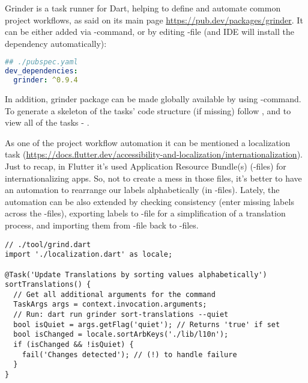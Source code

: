 Grinder is a task runner for Dart, helping to define and automate common project workflows, as said on its main page
\href{https://pub.dev/packages/grinder}{https://pub.dev/packages/grinder}.  It can be either added via -command, or by editing -file  (and IDE will install the dependency automatically):

\begin{lstlisting}[language=yaml]
## ./pubspec.yaml
dev_dependencies:
  grinder: ^0.9.4
\end{lstlisting}

In addition, grinder package can be made globally available by using -command. 
To generate a skeleton of the tasks' code structure (if missing) follow , and 
to view all of the tasks - .

As one of the project workflow automation it can be mentioned a localization task 
(\href{https://docs.flutter.dev/accessibility-and-localization/internationalization}{https://docs.flutter.dev/accessibility-and-localization/internationalization}). 
Just to recap, in Flutter it's used Application Resource Bundle(s) (-files) for internationalizing apps. 
So, not to create a mess in those files, it's better to have an automation to rearrange our labels alphabetically
(in -files). Lately, the automation can be also extended by checking consistency (enter missing 
labels across the -files), exporting labels to -file for a simplification of a translation process, and 
importing them from -file back to -files.

\begin{lstlisting}
// ./tool/grind.dart
import './localization.dart' as locale;

@Task('Update Translations by sorting values alphabetically')
sortTranslations() {
  // Get all additional arguments for the command
  TaskArgs args = context.invocation.arguments;
  // Run: dart run grinder sort-translations --quiet
  bool isQuiet = args.getFlag('quiet'); // Returns 'true' if set
  bool isChanged = locale.sortArbKeys('./lib/l10n');
  if (isChanged && !isQuiet) {
    fail('Changes detected'); // (!) to handle failure
  }
}
\end{lstlisting}

